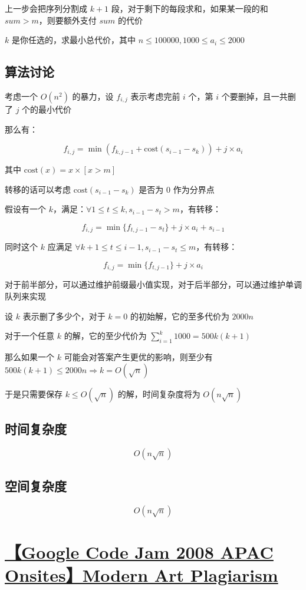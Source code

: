 \documentclass[UTF8]{article}
\begin{document}
上一步会把序列分割成 $k + 1$ 段，对于剩下的每段求和，如果某一段的和 $sum > m$，则要额外支付 $sum$ 的代价

$k$ 是你任选的，求最小总代价，其中 $n \le 100000, 1000 \le a_i \le 2000$

\subsection{算法讨论}

考虑一个 $O(n^2)$ 的暴力，设 $f_{i,j}$ 表示考虑完前 $i$ 个，第 $i$ 个要删掉，且一共删了 $j$ 个的最小代价

那么有：

$$
f_{i,j}=\min(f_{k,j-1}+\text{cost}(s_{i-1}-s_{k}))+j \times a_i
$$

其中 $\text{cost}(x)=x \times [x > m]$

转移的话可以考虑 $\text{cost}(s_{i-1}-s_{k})$ 是否为 $0$ 作为分界点

假设有一个 $k$，满足：$\forall 1 \le t \le k, s_{i-1}-s_{t} > m$，有转移：

$$
f_{i,j} = \min\{ f_{t,j-1}-s_t \} +j \times a_i+s_{i-1}
$$

同时这个 $k$ 应满足 $\forall k+1 \le t \le i-1, s_{i-1}-s_{t} \le m$，有转移：

$$
f_{i,j} = \min \{ f_{t,j-1} \} +j \times a_i
$$

对于前半部分，可以通过维护前缀最小值实现，对于后半部分，可以通过维护单调队列来实现

设 $k$ 表示删了多少个，对于 $k=0$ 的初始解，它的至多代价为 $2000n$

对于一个任意 $k$ 的解，它的至少代价为 $\sum_{i=1}^{k}1000=500k(k+1)$

那么如果一个 $k$ 可能会对答案产生更优的影响，则至少有 $500k(k+1) \le 2000n \Rightarrow k = O(\sqrt n)$

于是只需要保存 $k \le O(\sqrt n)$ 的解，时间复杂度将为 $O(n \sqrt n)$

\subsection{时间复杂度}

$$
O(n \sqrt n)
$$

\subsection{空间复杂度}

$$
O(n \sqrt n)
$$

\section{\href{https://www.lydsy.com/JudgeOnline/problem.php?id=2368}{【Google Code Jam 2008 APAC Onsites】Modern Art Plagiarism}}
\end{document}
